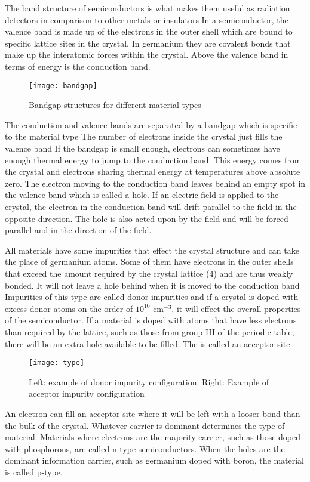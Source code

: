 The band structure of semiconductors is what makes them useful as radiation detectors in comparison to other metals or insulators
In a semiconductor, the valence band is made up of the electrons in the outer shell which are bound to specific lattice sites in the crystal.
In germanium they are covalent bonds that make up the interatomic forces within the crystal.
Above the valence band in terms of energy is the conduction band.
\begin{figure}[htpb]
\centering
\texttt{[image: bandgap]}
\caption{Bandgap structures for different material types}
\label{fig:bandgap}
\end{figure}
The conduction and valence bands are separated by a bandgap which is specific to the material type
The number of electrons inside the crystal just fills the valence band
If the bandgap is small enough, electrons can sometimes have enough thermal energy to jump to the conduction band.
This energy comes from the crystal and electrons sharing thermal energy at temperatures above absolute zero.
The electron moving to the conduction band leaves behind an empty spot in the valence band which is called a hole.
If an electric field is applied to the crystal, the electron in the conduction band will drift parallel to the field in the opposite direction.
The hole is also acted upon by the field and will be forced parallel and in the direction of the field.

All materials have some impurities that effect the crystal structure and can take the place of germanium atoms.
Some of them have electrons in the outer shells that exceed the amount required by the crystal lattice (4) and are thus weakly bonded.
It will not leave a hole behind when it is moved to the conduction band
Impurities of this type are called donor impurities and if a crystal is doped with excess donor atoms on the order of $10^{10}$ cm$^{-3}$, it will effect the overall properties of the semiconductor.
If a material is doped with atoms that have less electrons than required by the lattice, such as those from group III of the periodic table, there will be an extra hole available to be filled.
The is called an acceptor site
\begin{figure}[htpb]
\centering
\texttt{[image: type]}
\caption{Left: example of donor impurity configuration. Right: Example of acceptor impurity configuration}
\label{fig:type}
\end{figure}
An electron can fill an acceptor site where it will be left with a looser bond than the bulk of the crystal.
Whatever carrier is dominant determines the type of material.
Materials where electrons are the majority carrier, such as those doped with phosphorous, are called n-type semiconductors.
When the holes are the dominant information carrier, such as germanium doped with boron, the material is called p-type.

